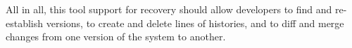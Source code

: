 All in all, this tool support for recovery should allow developers to find and re-establish versions, to create and delete lines of histories, and to diff and merge changes from one version of the system to another.

